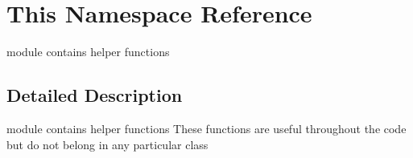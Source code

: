 \hypertarget{namespace_this}{\section{This Namespace Reference}
\label{namespace_this}
}


module contains helper functions  




\subsection{Detailed Description}
module contains helper functions These functions are useful throughout the code but do not belong in any particular class 